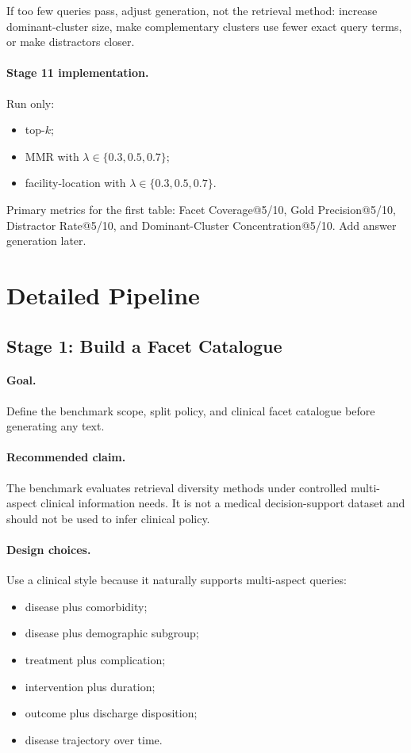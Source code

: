 \documentclass[11pt,a4paper]{article}
\newcommand{\stage}[2]{\subsection{\textcolor{betterblue}{#1}: #2}}
\begin{document}
If too few queries pass, adjust generation, not the retrieval method: increase dominant-cluster size, make complementary clusters use fewer exact query terms, or make distractors closer.

\paragraph{Stage 11 implementation.}
Run only:

\begin{itemize}[leftmargin=*]
	\item top-$k$;
	\item MMR with $\lambda \in \{0.3,0.5,0.7\}$;
	\item facility-location with $\lambda \in \{0.3,0.5,0.7\}$.
\end{itemize}

Primary metrics for the first table: Facet Coverage@5/10, Gold Precision@5/10, Distractor Rate@5/10, and Dominant-Cluster Concentration@5/10. Add answer generation later.

\section{Detailed Pipeline}

\stage{Stage 1}{Build a Facet Catalogue}

\paragraph{Goal.}
Define the benchmark scope, split policy, and clinical facet catalogue before generating any text.

\paragraph{Recommended claim.}
The benchmark evaluates retrieval diversity methods under controlled multi-aspect clinical information needs. It is not a medical decision-support dataset and should not be used to infer clinical policy.

\paragraph{Design choices.}
Use a clinical style because it naturally supports multi-aspect queries:

\begin{itemize}[leftmargin=*]
	\item disease plus comorbidity;
	\item disease plus demographic subgroup;
	\item treatment plus complication;
	\item intervention plus duration;
	\item outcome plus discharge disposition;
	\item disease trajectory over time.
\end{itemize}
\end{document}
